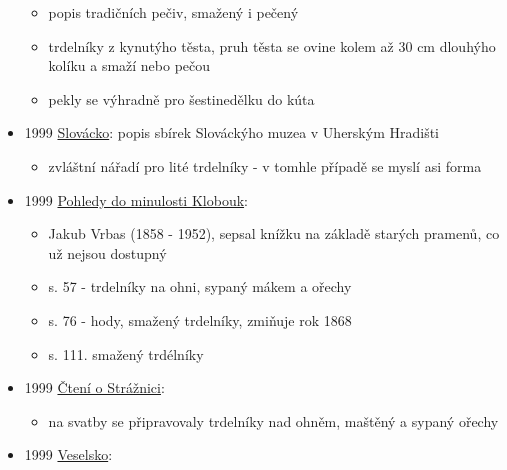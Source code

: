 \begin{itemize}
  \begin{itemize}
  \tightlist
  \item
    popis tradičních pečiv, smažený i pečený
  \item
    trdelníky z kynutýho těsta, pruh těsta se ovine kolem až 30 cm
    dlouhýho kolíku a smaží nebo pečou
  \item
    pekly se výhradně pro šestinedělku do kúta
  \end{itemize}
\item
  1999
  \href{https://ceskadigitalniknihovna.cz/view/uuid:57abf773-997c-406c-8ba1-063f2a52d0c4?page=uuid\%3A0ef9ff97-bf5a-11ed-9fa2-001b63bd97ba&fulltext=trdeln\%C3\%ADk\%20OR\%20trdeln\%C3\%ADky\%20OR\%20trdeln\%C3\%ADk\%C5\%AF&source=kfbz}{Slovácko}:
  popis sbírek Slováckýho muzea v Uherským Hradišti

  \begin{itemize}
  \tightlist
  \item
    zvláštní nářadí pro lité trdelníky - v tomhle případě se myslí asi
    forma
  \end{itemize}
\item
  1999
  \href{https://ceskadigitalniknihovna.cz/view/uuid:288aee50-92f1-11ec-a3e4-5ef3fc9bb22f?page=uuid\%3A82f08da1-51aa-455c-8d5d-cb64c45aa594&fulltext=trdeln\%C3\%ADk\%20OR\%20trdeln\%C3\%ADky\%20OR\%20trdeln\%C3\%ADk\%C5\%AF&source=nkp}{Pohledy
  do minulosti Klobouk}:

  \begin{itemize}
  \tightlist
  \item
    Jakub Vrbas (1858 - 1952), sepsal knížku na základě starých pramenů,
    co už nejsou dostupný
  \item
    s. 57 - trdelníky na ohni, sypaný mákem a ořechy
  \item
    s. 76 - hody, smažený trdelníky, zmiňuje rok 1868
  \item
    s. 111. smažený trdélníky
  \end{itemize}
\item
  1999
  \href{https://ceskadigitalniknihovna.cz/view/uuid:1205dd30-22f9-11ef-be46-0050568d319f?page=uuid\%3A744a56c4-b1cb-4846-840b-498bb5fc53a8&fulltext=trdeln\%C3\%ADk\%20OR\%20trdeln\%C3\%ADky\%20OR\%20trdeln\%C3\%ADk\%C5\%AF&source=mzk}{Čtení
  o Strážnici}:

  \begin{itemize}
  \tightlist
  \item
    na svatby se připravovaly trdelníky nad ohněm, maštěný a sypaný
    ořechy
  \end{itemize}
\item
  1999
  \href{https://ceskadigitalniknihovna.cz/view/uuid:9ee83d54-e4ea-4999-9b2d-7fd7bc1b19a1?page=uuid\%3A57ffd5a3-50a8-11e5-8200-0050569d679d&fulltext=trdeln\%C3\%ADk\%20OR\%20trdeln\%C3\%ADky\%20OR\%20trdeln\%C3\%ADk\%C5\%AF&source=mzk}{Veselsko}:


\end{itemize}
